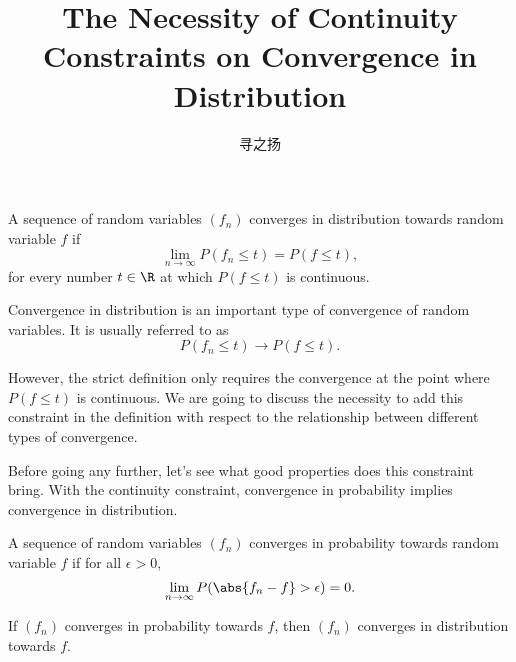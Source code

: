 

\title{The Necessity of Continuity Constraints on Convergence in Distribution}
\author{寻之扬}

    \maketitle

    \begin{tcolorbox}
        \begin{definition}
            A sequence of random variables $(f_n)$ converges in distribution towards random variable $f$ if
            \[ \lim_{n \to \infty} P(f_n \leq t) = P(f \leq t) ,\]
            for every number $t \in \R$ at which $P(f \leq t)$ is continuous.
        \end{definition}
    \end{tcolorbox}

    Convergence in distribution is an important type of convergence of random variables. It is usually referred to as \[
        P(f_n \leq t) \to P(f \leq t).    
    \]

    However, the strict definition only requires the convergence at the point where $P(f \leq t)$ is continuous. We are going to discuss the necessity to add this constraint in the definition with respect to the relationship between different types of convergence.

    Before going any further, let's see what good properties does this constraint bring. With the continuity constraint, convergence in probability implies convergence in distribution.

    \begin{definition}
        A sequence of random variables $(f_n)$ converges in probability towards random variable $f$ if for all $\epsilon > 0$,
        \[ \lim_{n \to \infty} P(\abs{f_n - f} > \epsilon) = 0.\]
    \end{definition}

    \begin{theorem}
        If $(f_n)$ converges in probability towards $f$, then $(f_n)$ converges in distribution towards $f$.
    \end{theorem}


